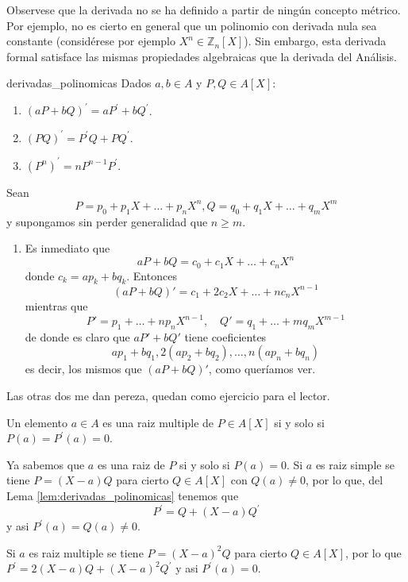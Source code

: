 Observese que la derivada no se ha definido a partir de ningún concepto métrico. Por ejemplo, no es cierto en general que un polinomio con derivada nula sea constante (considérese por ejemplo $X^{n}\in\mathbb{Z}_{n}[X]$). Sin embargo, esta derivada formal satisface las mismas propiedades algebraicas que la derivada del Análisis.

\begin{lemma}{}{derivadas_polinomicas}
Dados $a,b\in A$ y $P,Q\in A[X]$:
\begin{enumerate}
\item $(aP+bQ)^{\prime}=aP^{\prime}+bQ^{\prime}$.
\item $(PQ)^{\prime}=P^{\prime}Q+PQ^{\prime}$.
\item $(P^{n})^{\prime}=nP^{n-1}P^{\prime}$.
\end{enumerate}
\end{lemma}

\begin{proofbox}
Sean
\[
P = p_0 + p_1 X + \dots + p_n X^n, Q = q_0 + q_1 X + \dots + q_m X^m
\]
y supongamos sin perder generalidad que $n \geq m$.
\begin{enumerate}
\item Es inmediato que
\[
aP + bQ = c_0 + c_1 X + \dots + c_n X^n
\]
donde $c_k = ap_k + bq_k$. Entonces
\[
(aP+bQ)' = c_1 + 2c_2 X + \dots + nc_n X^{n-1} 
\]
mientras que 
\[
P' = p_1 + \dots + np_n X^{n-1},\quad Q' = q_1 + \dots + mq_m X^{m-1}
\]
de donde es claro que $aP' + bQ'$ tiene coeficientes
\[
ap_1 + bq_1, 2(ap_2 + bq_2), \dots, n(ap_n + bq_n)
\]
es decir, los mismos que $(aP+bQ)'$, como queríamos ver.
\end{enumerate}

Las otras dos me dan pereza, quedan como ejercicio para el lector.
\end{proofbox}

\begin{proposition}{}{}
Un elemento $a\in A$ es una raiz multiple de $P\in A[X]$ si y solo si $P(a)=P^{\prime}(a)=0$.
\end{proposition}

\begin{proofbox}
Ya sabemos que $a$ es una raiz de $P$ si y solo si $P(a)=0$. Si $a$ es raiz simple se tiene $P=(X-a)Q$ para cierto $Q\in A[X]$ con $Q(a)\neq 0$, por lo que, del Lema \ref{lem:derivadas_polinomicas} tenemos que
\[
P^{\prime}=Q+(X-a)Q^{\prime}
\]
y asi $P^{\prime}(a)=Q(a)\neq 0$.

Si $a$ es raiz multiple se tiene $P=(X-a)^{2}Q$ para cierto $Q\in A[X]$, por lo que $P^{\prime}=2(X-a)Q+(X-a)^{2}Q^{\prime}$ y asi $P^{\prime}(a)=0$.
\end{proofbox}

